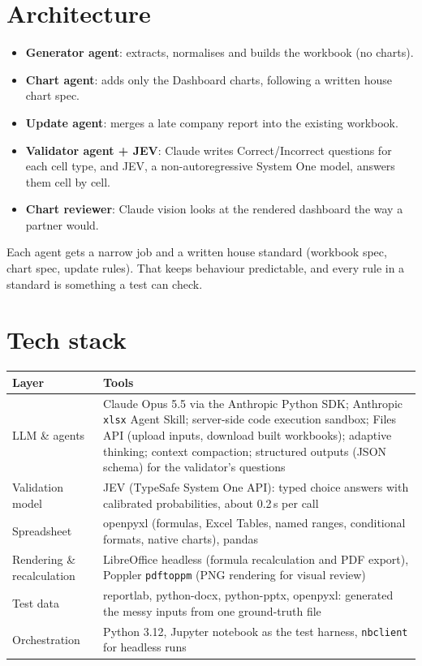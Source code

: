 \documentclass[11pt,a4paper]{article}
\newcommand{\code}[1]{\texttt{\small #1}}
\begin{document}
\section{Architecture}
\begin{itemize}
  \item \textbf{Generator agent}: extracts, normalises and builds the workbook (no charts).
  \item \textbf{Chart agent}: adds only the Dashboard charts, following a written house chart spec.
  \item \textbf{Update agent}: merges a late company report into the existing workbook.
  \item \textbf{Validator agent + JEV}: Claude writes Correct/Incorrect questions for each cell type, and JEV,
        a non-autoregressive System One model, answers them cell by cell.
  \item \textbf{Chart reviewer}: Claude vision looks at the rendered dashboard the way a partner would.
\end{itemize}
Each agent gets a narrow job and a written house standard (workbook spec, chart spec, update rules). That
keeps behaviour predictable, and every rule in a standard is something a test can check.

\section{Tech stack}
\begin{tabularx}{\textwidth}{@{}lX@{}}
\toprule
\textbf{Layer} & \textbf{Tools} \\
\midrule
LLM \& agents  & Claude Opus 5.5 via the Anthropic Python SDK; Anthropic \code{xlsx} Agent Skill; server-side
                 code execution sandbox; Files API (upload inputs, download built workbooks); adaptive
                 thinking; context compaction; structured outputs (JSON schema) for the validator's questions \\
Validation model & JEV (TypeSafe System One API): typed choice answers with calibrated probabilities, about
                 0.2\,s per call \\
Spreadsheet    & openpyxl (formulas, Excel Tables, named ranges, conditional formats, native charts), pandas \\
Rendering \& recalculation & LibreOffice headless (formula recalculation and PDF export), Poppler
                 \code{pdftoppm} (PNG rendering for visual review) \\
Test data      & reportlab, python-docx, python-pptx, openpyxl: generated the messy inputs from one
                 ground-truth file \\
Orchestration  & Python 3.12, Jupyter notebook as the test harness, \code{nbclient} for headless runs \\
\bottomrule
\end{tabularx}
\end{document}
